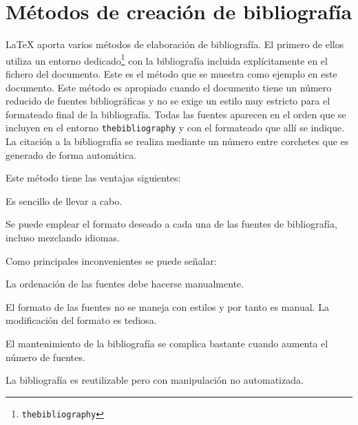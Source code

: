 \documentclass[11pt,a4paper]{article}
\begin{document}
\section{Métodos de creación de bibliografía}
\LaTeX{} aporta varios métodos de elaboración de bibliografía. El primero de ellos utiliza un entorno dedicado\footnote{ \texttt{thebibliography}} con la bibliografía incluida explícitamente en el fichero del documento. Este es el método que se muestra como ejemplo en este documento. Este método es apropiado cuando el documento tiene un número reducido de fuentes bibliográficas y no se exige un estilo muy estricto para el formateado final de la bibliografía. Todas las fuentes aparecen en el orden que se incluyen en el entorno \texttt{thebibliography} y con el formateado que allí se indique. La citación a la bibliografía se realiza mediante un número entre corchetes que es generado de forma automática.
	

\noindent Este método tiene las ventajas siguientes:
\begin{dinglist}{51}
	\item Es sencillo de llevar a cabo.
	
	\item Se puede emplear el formato deseado a cada una de las fuentes de bibliografía, incluso mezclando idiomas.
\end{dinglist}

\noindent Como principales inconvenientes se puede señalar:
\begin{dinglist}{55}
	\item La ordenación de las fuentes debe hacerse manualmente.
	
	\item El formato de las fuentes no se maneja con estilos y por tanto es manual. La modificación del formato es tediosa.
	
	\item El mantenimiento de la bibliografía se complica bastante cuando aumenta el número de fuentes.
	
	\item La bibliografía es reutilizable pero con manipulación no automatizada.
\end{dinglist}
\end{document}

